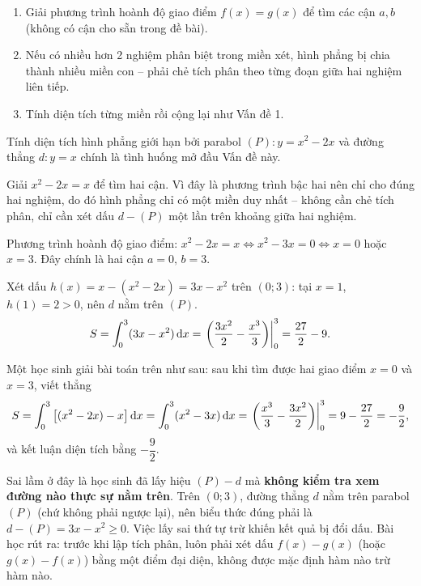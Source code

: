 \begin{hopphuongphap}
\begin{enumerate}[leftmargin=1cm]
  \item Giải phương trình hoành độ giao điểm $f(x)=g(x)$ để tìm các cận $a,b$ (không có cận cho sẵn trong đề bài).
  \item Nếu có nhiều hơn 2 nghiệm phân biệt trong miền xét, hình phẳng bị chia thành nhiều miền con -- phải chẻ tích phân theo từng đoạn giữa hai nghiệm liên tiếp.
  \item Tính diện tích từng miền rồi cộng lại như Vấn đề 1.
\end{enumerate}
\end{hopphuongphap}

\begin{hopvidu}
Tính diện tích hình phẳng giới hạn bởi parabol $(P): y=x^2-2x$ và đường thẳng $d: y=x$  chính là tình huống mở đầu Vấn đề này.
\end{hopvidu}

\begin{hopyduong}
Giải $x^2-2x=x$ để tìm hai cận. Vì đây là phương trình bậc hai nên chỉ cho đúng hai nghiệm, do đó hình phẳng chỉ có một miền duy nhất -- không cần chẻ tích phân, chỉ cần xét dấu $d-(P)$ một lần trên khoảng giữa hai nghiệm.
\end{hopyduong}

\begin{loigiai}
Phương trình hoành độ giao điểm: $x^2-2x=x \Leftrightarrow x^2-3x=0 \Leftrightarrow x=0$ hoặc $x=3$. Đây chính là hai cận $a=0,\,b=3$.

Xét dấu $h(x)=x-(x^2-2x)=3x-x^2$ trên $(0;3)$: tại $x=1$, $h(1)=2>0$, nên $d$ nằm trên $(P)$.
\[
S=\int_0^3 (3x-x^2)\,\mathrm{d}x = \left.\left(\frac{3x^2}{2}-\frac{x^3}{3}\right)\right|_0^3 = \frac{27}{2}-9.
\]
\end{loigiai}

\begin{hopsailam}
Một học sinh giải bài toán trên như sau: sau khi tìm được hai giao điểm $x=0$ và $x=3$, viết thẳng
\[
S=\int_0^3\big[(x^2-2x)-x\big]\,\mathrm{d}x = \int_0^3(x^2-3x)\,\mathrm{d}x = \left.\left(\frac{x^3}{3}-\frac{3x^2}{2}\right)\right|_0^3 = 9-\frac{27}{2}=-\frac{9}{2},
\]
và kết luận diện tích bằng $-\dfrac92$.

Sai lầm ở đây là học sinh đã lấy hiệu $(P)-d$ mà \textbf{không kiểm tra xem đường nào thực sự nằm trên}. Trên $(0;3)$, đường thẳng $d$ nằm trên parabol $(P)$ (chứ không phải ngược lại), nên biểu thức đúng phải là $d-(P)=3x-x^2\ge0$. Việc lấy sai thứ tự trừ khiến kết quả bị đổi dấu. Bài học rút ra: trước khi lập tích phân, luôn phải xét dấu $f(x)-g(x)$ (hoặc $g(x)-f(x)$) bằng một điểm đại diện, không được mặc định hàm nào trừ hàm nào.
\end{hopsailam}


